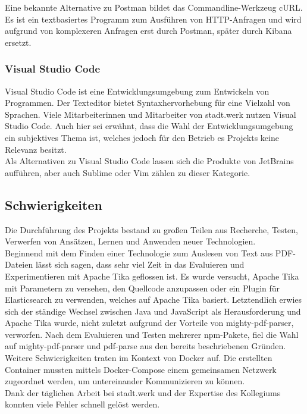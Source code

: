 \documentclass[a4paper]{scrartcl}
\begin{document}
Eine bekannte Alternative zu Postman bildet das Commandline-Werkzeug cURL. Es ist ein textbasiertes Programm zum Ausführen von HTTP-Anfragen und wird aufgrund von komplexeren Anfragen erst durch Postman, später durch Kibana ersetzt.

\subsubsection{Visual Studio Code}
Visual Studio Code ist eine Entwicklungsumgebung zum Entwickeln von Programmen. Der Texteditor bietet Syntaxhervorhebung für eine Vielzahl von Sprachen. Viele Mitarbeiterinnen und Mitarbeiter von stadt.werk nutzen Visual Studio Code. Auch hier sei erwähnt, dass die Wahl der Entwicklungsumgebung ein subjektives Thema ist, welches jedoch für den Betrieb es Projekts keine Relevanz besitzt. \\

Als Alternativen zu Visual Studio Code lassen sich die Produkte von JetBrains aufführen, aber auch Sublime oder Vim zählen zu dieser Kategorie.

\subsection{Schwierigkeiten}
Die Durchführung des Projekts bestand zu großen Teilen aus Recherche, Testen, Verwerfen von Ansätzen, Lernen und Anwenden neuer Technologien. \\
Beginnend mit dem Finden einer Technologie zum Auslesen von Text aus PDF-Dateien lässt sich sagen, dass sehr viel Zeit in das Evaluieren und Experimentieren mit Apache Tika geflossen ist. Es wurde versucht, Apache Tika mit Parametern zu versehen, den Quellcode anzupassen oder ein Plugin für Elasticsearch zu verwenden, welches auf Apache Tika basiert. Letztendlich erwies sich der ständige Wechsel zwischen Java und JavaScript als Herausforderung und Apache Tika wurde, nicht zuletzt aufgrund der Vorteile von mighty-pdf-parser, verworfen. Nach dem Evaluieren und Testen mehrerer npm-Pakete, fiel die Wahl auf mighty-pdf-parser und pdf-parse aus den bereits beschriebenen Gründen. \\
Weitere Schwierigkeiten traten im Kontext von Docker auf. Die erstellten Container mussten mittels Docker-Compose einem gemeinsamen Netzwerk zugeordnet werden, um untereinander Kommunizieren zu können. \\
Dank der täglichen Arbeit bei stadt.werk und der Expertise des Kollegiums konnten viele Fehler schnell gelöst werden.
    
\end{document}
